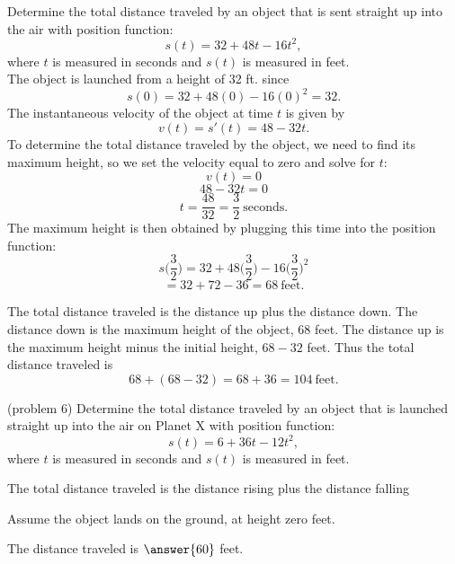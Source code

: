 \documentclass{ximera}
\begin{document}
 
\begin{example}[example 6]
Determine the total distance traveled by
an object that is sent straight up into the air with position function:
\[s(t) = 32 + 48t - 16t^2,\]
where $t$ is measured in seconds and $s(t)$ is measured in feet. \\
The object is launched from a height of 32 ft. since 
\[s(0) = 32 + 48(0) - 16(0)^2 = 32.\]
The instantaneous velocity of the object at time $t$ is given by
\[v(t) = s'(t) = 48-32t.\]
To determine the total distance traveled by the object, we need to find its maximum height, so
we set the velocity equal to zero and solve for $t$:
\[v(t) = 0  \] 
\[48-32t = 0\]
\[t = \frac{48}{32} = \frac{3}{2} \ \text{seconds}.\]
The maximum height is then obtained by plugging this time into the position function:
\[s\Big(\frac{3}{2}\Big) = 32 + 48\Big(\frac{3}{2}\Big) - 16\Big(\frac{3}{2}\Big)^2 \]
\[= 32 + 72 - 36 = 68 \  \text{feet}. \]

The total distance traveled is the distance up plus the distance down.  The distance down is the maximum height of the object,
$68$ feet.  The distance up is the maximum height minus the initial height, $68 - 32$ feet.
Thus the total distance traveled is  
\[68 + (68 - 32) = 68 + 36 = 104 \ \text{feet}.\]
\end{example}



\begin{problem}(problem 6)
Determine the total distance traveled by an object that is launched straight up into the air on Planet X with position function:
\[s(t) = 6 + 36t - 12t^2,\]
where $t$ is measured in seconds and $s(t)$ is measured in feet. 

\begin{hint}
The total distance traveled is the distance rising plus the distance falling
\end{hint}
\begin{hint}
Assume the object lands on the ground, at height zero feet.
\end{hint}

The distance traveled is $\answer{60}$ feet.

\end{problem}
\end{document}
